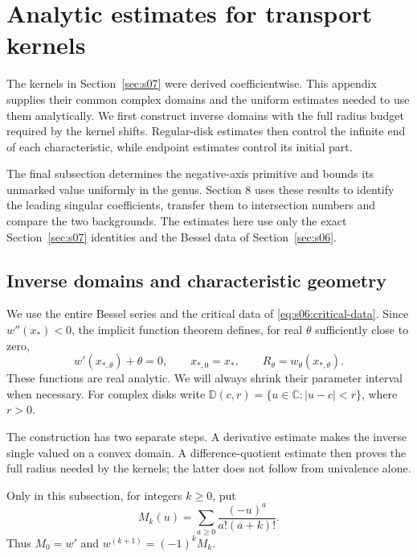\documentclass[a4paper,10pt]{article}
\numberwithin{equation}{section}
\theoremstyle{paperplain}
\theoremstyle{paperremark}
\theoremstyle{paperplain}
\begin{document}
\section{Analytic estimates for transport kernels}
\label{sec:appendix-b}

The kernels in Section~\ref{sec:s07} were derived coefficientwise.
This appendix supplies their common complex domains and the uniform
estimates needed to use them analytically. We first construct inverse
domains with the full radius budget required by the kernel shifts.
Regular-disk estimates then control the infinite end of each
characteristic, while endpoint estimates control its initial part.

The final subsection determines the negative-axis primitive and bounds
its unmarked value uniformly in the genus. Section 8 uses these results
to identify the leading singular coefficients, transfer them to
intersection numbers and compare the two backgrounds. The estimates
here use only the exact Section~\ref{sec:s07} identities and the
Bessel data of Section~\ref{sec:s06}.

\subsection{Inverse domains and characteristic geometry}
\label{subsec:b:domains}

We use the entire Bessel series and the critical data of
\eqref{eq:s06:critical-data}. Since $w''(x_*)<0$, the implicit
function theorem defines, for real $\theta$ sufficiently close to zero,
\begin{equation}\label{eq:b:critical-data}
 w'(x_{*,\theta})+\theta=0,\qquad
 x_{*,0}=x_*,\qquad R_\theta=w_\theta(x_{*,\theta}).
\end{equation}
These functions are real analytic. We will always shrink their
parameter interval when necessary. For complex disks write
$\mathbb D(c,r)=\{u\in\mathbb C:|u-c|<r\}$, where $r>0$.

The construction has two separate steps. A derivative estimate makes
the inverse single valued on a convex domain. A difference-quotient
estimate then proves the full radius needed by the kernels; the latter
does not follow from univalence alone.

Only in this subsection, for integers $k\geq0$, put
\[
 M_k(u)=\sum_{a\geq0}\frac{(-u)^a}{a!(a+k)!}.
\]
Thus $M_0=w'$ and $w^{(k+1)}=(-1)^kM_k$.
\end{document}
